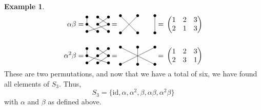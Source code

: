 \documentclass[svgnames]{article}
\theoremstyle{definition}
\newtheorem{Example}[Theorem]{Example}
\theoremstyle{remark}
\newcommand{\id}{\mathrm{id}}
\begin{document}
\begin{appendices}
\begin{Example}
\begin{align*}
\alpha\beta & = \,\vcenter{\xymatrix@R=1em@C=1.5em{
		*=0{\bullet} \ar@{-}[d]		&	*=0{\bullet} \ar@{-}[dr]	&	*=0{\bullet} \ar@{-}[dl]\\
		*=0{\bullet} \ar@{-}[dr]	&	*=0{\bullet} \ar@{-}[dr]	&	*=0{\bullet} \ar@{-}[dll]\\
		*=0{\bullet}				&	*=0{\bullet}				&	*=0{\bullet}\\		
}}\, = \,\vcenter{\xymatrix{
		*=0{\bullet} \ar@{-}[dr]	&	*=0{\bullet} \ar@{-}[dl]	&	*=0{\bullet} \ar@{-}[d]\\
		*=0{\bullet}				&	*=0{\bullet}				&	*=0{\bullet}\\
}}\, = \,\begin{pmatrix}
1 & 2 & 3\\
2 & 1 & 3
\end{pmatrix}\\
{}\\
\alpha^2\beta & = \,\vcenter{\xymatrix@R=1em@C=1.5em{
		*=0{\bullet} \ar@{-}[d]		&	*=0{\bullet} \ar@{-}[dr]	&	*=0{\bullet} \ar@{-}[dl]\\
		*=0{\bullet} \ar@{-}[drr]	&	*=0{\bullet} \ar@{-}[dl]	&	*=0{\bullet} \ar@{-}[dl]\\
		*=0{\bullet}				&	*=0{\bullet}				&	*=0{\bullet}\\		
}}\, = \,\vcenter{\xymatrix{
		*=0{\bullet} \ar@{-}[drr]	&	*=0{\bullet} \ar@{-}[d]	&	*=0{\bullet} \ar@{-}[dll]\\
		*=0{\bullet}				&	*=0{\bullet}				&	*=0{\bullet}\\
}}\, = \,\begin{pmatrix}
1 & 2 & 3\\
2 & 3 & 1
\end{pmatrix}
\end{align*}
These are two permutations, and now that we have a total of six, we have found all elements of $S_3$. Thus,
\begin{equation*}
S_3 = \{\id, \alpha, \alpha^2, \beta, \alpha\beta, \alpha^2 \beta\}
\end{equation*}
with $\alpha$ and $\beta$ as defined above.


\end{Example}
\end{appendices}
\end{document}
